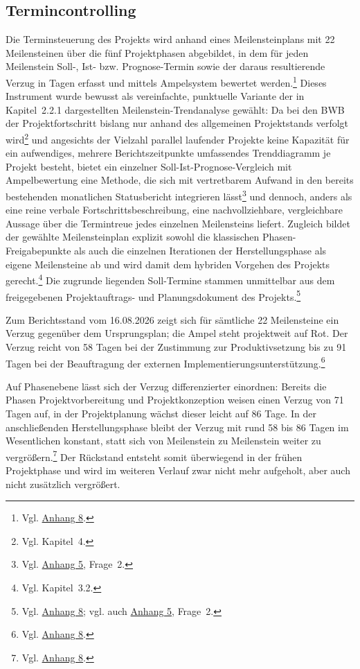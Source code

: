 \documentclass[
    12pt, 
    a4paper,
    ]{scrartcl} %
\begin{document}
\subsection{Termincontrolling}
Die Terminsteuerung des Projekts wird anhand eines Meilensteinplans mit 22 Meilensteinen über die fünf Projektphasen abgebildet, in dem für jeden Meilenstein Soll-, Ist- bzw. Prognose-Termin sowie der daraus resultierende Verzug in Tagen erfasst und mittels Ampelsystem bewertet werden.\footnote{Vgl. \hyperref[sec:Anhang8]{Anhang 8}.} Dieses Instrument wurde bewusst als vereinfachte, punktuelle Variante der in Kapitel~2.2.1 dargestellten Meilenstein-Trendanalyse gewählt: Da bei den BWB der Projektfortschritt bislang nur anhand des allgemeinen Projektstands verfolgt wird\footnote{Vgl. Kapitel~4.} und angesichts der Vielzahl parallel laufender Projekte keine Kapazität für ein aufwendiges, mehrere Berichtszeitpunkte umfassendes Trenddiagramm je Projekt besteht, bietet ein einzelner Soll-Ist-Prognose-Vergleich mit Ampelbewertung eine Methode, die sich mit vertretbarem Aufwand in den bereits bestehenden monatlichen Statusbericht integrieren lässt\footnote{Vgl. \hyperref[sec:Anhang5]{Anhang 5}, Frage~2.} und dennoch, anders als eine reine verbale Fortschrittsbeschreibung, eine nachvollziehbare, vergleichbare Aussage über die Termintreue jedes einzelnen Meilensteins liefert. Zugleich bildet der gewählte Meilensteinplan explizit sowohl die klassischen Phasen-Freigabepunkte als auch die einzelnen Iterationen der Herstellungsphase als eigene Meilensteine ab und wird damit dem hybriden Vorgehen des Projekts gerecht.\footnote{Vgl. Kapitel~3.2.} Die zugrunde liegenden Soll-Termine stammen unmittelbar aus dem freigegebenen Projektauftrags- und Planungsdokument des Projekts.\footnote{Vgl. \hyperref[sec:Anhang8]{Anhang 8}; vgl. auch \hyperref[sec:Anhang5]{Anhang 5}, Frage~2.}

Zum Berichtsstand vom 16.08.2026 zeigt sich für sämtliche 22 Meilensteine ein Verzug gegenüber dem Ursprungsplan; die Ampel steht projektweit auf Rot. Der Verzug reicht von 58 Tagen bei der Zustimmung zur Produktivsetzung bis zu 91 Tagen bei der Beauftragung der externen Implementierungsunterstützung.\footnote{Vgl. \hyperref[sec:Anhang8]{Anhang 8}.}

Auf Phasenebene lässt sich der Verzug differenzierter einordnen: Bereits die Phasen Projektvorbereitung und Projektkonzeption weisen einen Verzug von 71 Tagen auf, in der Projektplanung wächst dieser leicht auf 86 Tage. In der anschließenden Herstellungsphase bleibt der Verzug mit rund 58 bis 86 Tagen im Wesentlichen konstant, statt sich von Meilenstein zu Meilenstein weiter zu vergrößern.\footnote{Vgl. \hyperref[sec:Anhang8]{Anhang 8}.} Der Rückstand entsteht somit überwiegend in der frühen Projektphase und wird im weiteren Verlauf zwar nicht mehr aufgeholt, aber auch nicht zusätzlich vergrößert.
\end{document}
